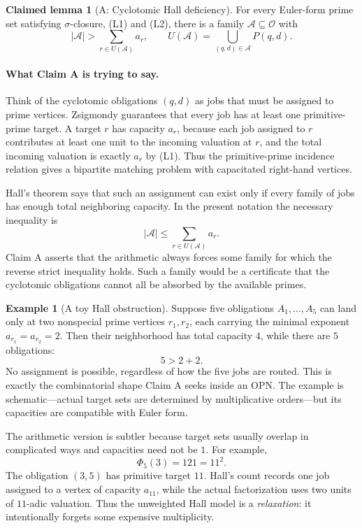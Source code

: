 \documentclass[11pt]{article}
\theoremstyle{definition}
\newtheorem{example}[theorem]{Example}
\newtheorem{claim}[theorem]{Claimed lemma}
\theoremstyle{remark}
\begin{document}
\begin{claim}[A: Cyclotomic Hall deficiency]
For every Euler-form prime set satisfying $\sigma$-closure, (L1) and
(L2), there is a family $\mathcal A\subseteq\mathcal O$ with
\[
|\mathcal A|>\sum_{r\in U(\mathcal A)}a_r,
\qquad U(\mathcal A)=\bigcup_{(q,d)\in\mathcal A}P(q,d).\tag{H}
\]
\end{claim}

\paragraph{What Claim A is trying to say.}
Think of the cyclotomic obligations $(q,d)$ as jobs that must be assigned to
prime vertices.  Zsigmondy guarantees that every job has at least one
primitive-prime target.  A target $r$ has capacity $a_r$, because each job
assigned to $r$ contributes at least one unit to the incoming valuation at
$r$, and the total incoming valuation is exactly $a_r$ by (L1).  Thus the
primitive-prime incidence relation gives a bipartite matching problem with
capacitated right-hand vertices.

Hall's theorem says that such an assignment can exist only if every family of
jobs has enough total neighboring capacity.  In the present notation the
necessary inequality is
\[
|\mathcal A|\le \sum_{r\in U(\mathcal A)}a_r.
\]
Claim A asserts that the arithmetic always forces some family for which the
reverse strict inequality holds.  Such a family would be a certificate that
the cyclotomic obligations cannot all be absorbed by the available primes.

\begin{example}[A toy Hall obstruction]
Suppose five obligations $A_1,\dots,A_5$ can land only at two nonspecial
prime vertices $r_1,r_2$, each carrying the minimal exponent
$a_{r_1}=a_{r_2}=2$.  Then their neighborhood has total capacity $4$, while
there are $5$ obligations:
\[
5>2+2.
\]
No assignment is possible, regardless of how the five jobs are routed.
This is exactly the combinatorial shape Claim A seeks inside an OPN.  The
example is schematic---actual target sets are determined by multiplicative
orders---but its capacities are compatible with Euler form.
\end{example}

The arithmetic version is subtler because target sets usually overlap in
complicated ways and capacities need not be $1$.  For example,
\[
\Phi_5(3)=121=11^2.
\]
The obligation $(3,5)$ has primitive target $11$.  Hall's count records one
job assigned to a vertex of capacity $a_{11}$, while the actual factorization
uses two units of $11$-adic valuation.  Thus the unweighted Hall model is a
\emph{relaxation}: it intentionally forgets some expensive multiplicity.
\end{document}
